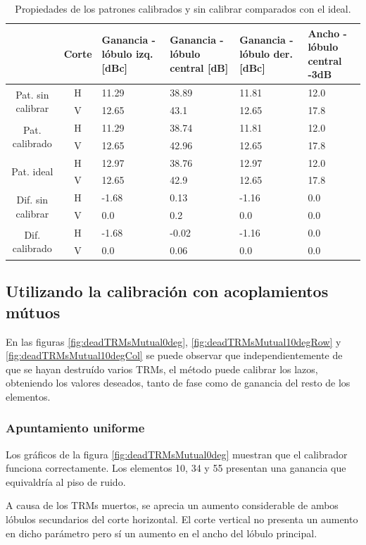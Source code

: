 \begin{table}[H]
  \footnotesize
  \centering
  \begin{tabular}{|c|c|p{2cm}|p{2.5cm}|p{2.5cm}|p{2.5cm}|}
    \cline{2-6}
    \multicolumn{1}{c|}{} & Corte & Ganancia - lóbulo izq. [dBc] & Ganancia - lóbulo central [dB] &
    Ganancia - lóbulo der. [dBc] & Ancho - lóbulo central -3dB \tabularnewline\hline
    \multirow{2}{2cm}{Pat. sin calibrar} & H & 11.29 & 38.89 & 11.81 & 12.0 \tabularnewline\cline{2-6}
     & V & 12.65 & 43.1 & 12.65 & 17.8 \tabularnewline\hline
    \multirow{2}{2cm}{Pat. calibrado} & H & 11.29 & 38.74 & 11.81 & 12.0 \tabularnewline\cline{2-6}
     & V & 12.65 & 42.96 & 12.65 & 17.8 \tabularnewline\hline
    \multirow{2}{2cm}{Pat. ideal} & H & 12.97 & 38.76 & 12.97 & 12.0 \tabularnewline\cline{2-6}
     & V & 12.65 & 42.9 & 12.65 & 17.8 \tabularnewline\hline
    \multirow{2}{2cm}{Dif. sin calibrar} & H & -1.68 & 0.13 & -1.16 & 0.0\tabularnewline\cline{2-6}
     & V & 0.0 & 0.2 & 0.0 & 0.0 \tabularnewline\hline
    \multirow{2}{2cm}{Dif. calibrado} & H & -1.68 & -0.02 & -1.16 & 0.0 \tabularnewline\cline{2-6}
     & V & 0.0 & 0.06 & 0.0 & 0.0 \tabularnewline\hline
  \end{tabular}
  \caption{Propiedades de los patrones calibrados y sin calibrar comparados con el ideal.}
  \label{tab:deadTRMsClassical10degRow}
\end{table}


\subsection{Utilizando la calibración con acoplamientos mútuos}

En las figuras \ref{fig:deadTRMsMutual0deg}, \ref{fig:deadTRMsMutual10degRow} y  \ref{fig:deadTRMsMutual10degCol} se puede 
observar que independientemente de que se hayan destruído varios TRMs, el método puede calibrar los lazos, obteniendo los 
valores deseados, tanto de fase como de ganancia del resto de los elementos.

\subsubsection{Apuntamiento uniforme}

Los gráficos de la figura \ref{fig:deadTRMsMutual0deg} muestran que el calibrador funciona correctamente. Los elementos 10, 
34 y 55 presentan una ganancia que equivaldría al piso de ruido.

A causa de los TRMs muertos, se aprecia un aumento considerable de ambos lóbulos secundarios del corte horizontal. El corte 
vertical no presenta un aumento en dicho parámetro pero sí un aumento en el ancho del lóbulo principal.

